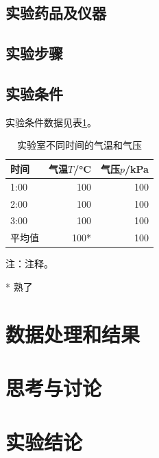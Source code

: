 \documentclass[UTF8]{article}
\begin{document}
	\subsection{实验药品及仪器}
	
	\subsection{实验步骤}
	
	\subsection{实验条件}
	实验条件数据见表\ref{tiaojian}。
	
	\begin{table}[htp]
		\centering
		\begin{threeparttable}
			\caption{实验室不同时间的气温和气压}\label{tiaojian}
			\begin{tabular} {lrr}
				\toprule
				时间 & 气温$T$/\si{\degreeCelsius} & 气压$p$/\si{\kilo\pascal}  \\
				\midrule
				1:00 & 100 & 100 \\
				2:00 & 100 & 100 \\
				3:00 & 100 & 100 \\
				\quad 平均值 & 100* & 100 \\
				\bottomrule
			\end{tabular}
		\small
		注：注释。
		\begin{tablenotes}
			\item[*] 熟了
		\end{tablenotes}
		\end{threeparttable}
	\end{table}
	
	\section{数据处理和结果}
	

	\section{思考与讨论}
	
	
	
	\section{实验结论}
	

	
	
	
	


	
\end{document}
